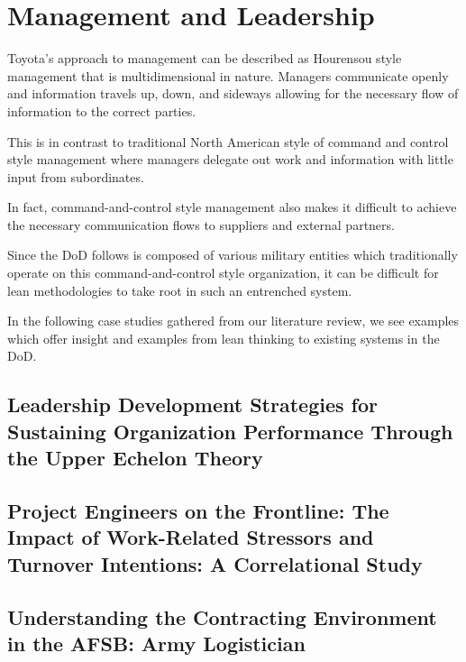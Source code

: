 \documentclass{article}
\begin{document}
	\begin{comment}
		Format:
		- Lean background, how toyota does things

		For each case study:
			- Case study summary
			- Lean analysis

	\end{comment}

	\section{Management and Leadership}

		Toyota's approach to management can be described as Hourensou style management that is multidimensional in nature.
		Managers communicate openly and information travels up, down, and sideways allowing for the necessary flow of information to the correct parties. 

		This is in contrast to traditional North American style of command and control style management where managers delegate out work and information with little input from subordinates.

		In fact, command-and-control style management also makes it difficult to achieve the necessary communication flows to suppliers and external partners.

		Since the DoD follows is composed of various military entities which traditionally operate on this command-and-control style organization, it can be difficult for lean methodologies to take root in such an entrenched system.

		In the following case studies gathered from our literature review, we see examples which offer insight and examples from lean thinking to existing systems in the DoD.


	\subsection{Leadership Development Strategies for Sustaining Organization Performance Through the Upper Echelon Theory \cite{McCants2024}}	




	\subsection{Project Engineers on the Frontline: The Impact of Work-Related Stressors and Turnover Intentions: A Correlational Study \cite{Turner2024}}



	\subsection{Understanding the Contracting Environment in the AFSB: Army Logistician}
\end{document}
